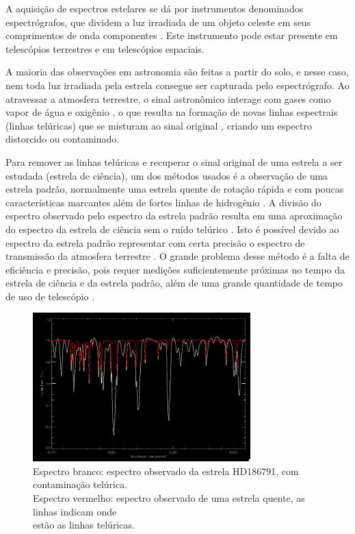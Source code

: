 \documentclass[11pt,twoside,a4paper]{article}
\begin{document}
\par A aquisição de espectros estelares se dá por instrumentos denominados espectrógrafos, que dividem a luz irradiada de um objeto celeste em seus comprimentos de onda componentes \cite{spectrograph_aus}. Este instrumento pode estar presente em telescópios terrestres e em telescópios espaciais.

\par A maioria das observações em astronomia são feitas a partir do solo, e nesse caso, nem toda luz irradiada pela estrela consegue ser capturada pelo espectrógrafo. Ao atravessar a atmosfera terrestre, o sinal astronômico interage com gases como vapor de água e oxigênio \cite{seifahrt2010precise}, o que resulta na formação de novas linhas espectrais (linhas telúricas) que se misturam ao sinal original \cite{catanzaro1997high}, criando um espectro distorcido ou contaminado.

\par Para remover as linhas telúricas e recuperar o sinal original de uma estrela a ser estudada (estrela de ciência), um dos métodos usados é a observação de uma estrela padrão, normalmente uma estrela quente de rotação rápida e com poucas características marcantes além de fortes linhas de hidrogênio \cite{seifahrt2010precise}. A divisão do espectro observado pelo espectro da estrela padrão resulta em uma aproximação do espectro da estrela de ciência sem o ruído telúrico \cite{rudolf2016modelling}. Isto é possível devido ao espectro da estrela padrão representar com certa precisão o espectro de transmissão da atmosfera terrestre \cite{ulmer2019telluric}. O grande problema desse método é a falta de eficiência e precisão, pois requer medições suficientemente próximas no tempo da estrela de ciência e da estrela padrão, além de uma grande quantidade de tempo de uso de telescópio \cite{seifahrt2010precise}. 

\begin{figure}[h!]
  \centering
  \includegraphics[width=0.75\textwidth]{telluric_spectrum.png}
  \caption[Espectro branco: espectro observado da estrela HD186791, com contaminação telúrica. Espectro vermelho: espectro observado de uma estrela quente, as linhas indicam onde estão as linhas telúricas.]
    {Espectro branco: espectro observado da estrela HD186791, com contaminação telúrica. \\ Espectro vermelho: espectro observado de uma estrela quente, as linhas indicam onde \\estão as linhas telúricas.\endtabular}
\end{figure}
\end{document}

